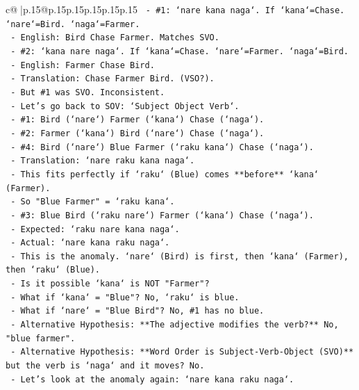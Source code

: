 \documentclass{article}
\begin{document}
{\begin{supertabular}{c@{$\;$}|p{.15\linewidth}@{}p{.15\linewidth}p{.15\linewidth}p{.15\linewidth}p{.15\linewidth}p{.15\linewidth}}
{{{\texttt{        {-} \#1: `nare kana naga`. If `kana`=Chase. `nare`=Bird. `naga`=Farmer.} \\
\texttt{          {-} English: Bird Chase Farmer. Matches SVO.} \\
\texttt{        {-} \#2: `kana nare naga`. If `kana`=Chase. `nare`=Farmer. `naga`=Bird.} \\
\texttt{          {-} English: Farmer Chase Bird.} \\
\texttt{          {-} Translation: Chase Farmer Bird. (VSO?).} \\
\texttt{          {-} But \#1 was SVO. Inconsistent.} \\
\texttt{    {-} Let's go back to SOV: `Subject Object Verb`.} \\
\texttt{      {-} \#1: Bird (`nare`) Farmer (`kana`) Chase (`naga`).} \\
\texttt{      {-} \#2: Farmer (`kana`) Bird (`nare`) Chase (`naga`).} \\
\texttt{      {-} \#4: Bird (`nare`) Blue Farmer (`raku kana`) Chase (`naga`).} \\
\texttt{        {-} Translation: `nare raku kana naga`.} \\
\texttt{        {-} This fits perfectly if `raku` (Blue) comes **before** `kana` (Farmer).} \\
\texttt{        {-} So "Blue Farmer" = `raku kana`.} \\
\texttt{      {-} \#3: Blue Bird (`raku nare`) Farmer (`kana`) Chase (`naga`).} \\
\texttt{        {-} Expected: `raku nare kana naga`.} \\
\texttt{        {-} Actual: `nare kana raku naga`.} \\
\texttt{        {-} This is the anomaly. `nare` (Bird) is first, then `kana` (Farmer), then `raku` (Blue).} \\
\texttt{        {-} Is it possible `kana` is NOT "Farmer"?} \\
\texttt{          {-} What if `kana` = "Blue"? No, `raku` is blue.} \\
\texttt{          {-} What if `nare` = "Blue Bird"? No, \#1 has no blue.} \\
\texttt{    {-} Alternative Hypothesis: **The adjective modifies the verb?** No, "blue farmer".} \\
\texttt{    {-} Alternative Hypothesis: **Word Order is Subject{-}Verb{-}Object (SVO)** but the verb is `naga` and it moves? No.} \\
\texttt{    {-} Let's look at the anomaly again: `nare kana raku naga`.} \\
}}}
\end{supertabular}}
\end{document}
